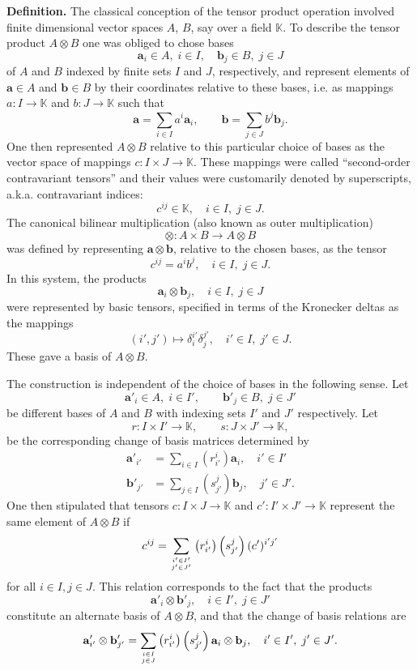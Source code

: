 \documentclass{article}
\newcommand{\lp}{\left(}
\newcommand{\rp}{\right)}
\newcommand{\va}{\mathbf{a}}
\newcommand{\vb}{\mathbf{b}}
\newcommand{\hva}{\mathbf{a}'}
\newcommand{\hvb}{\mathbf{b}'}
\newcommand{\kfield}{\mathbb{K}}
\newcommand{\hI}{I'}
\newcommand{\hJ}{J'}
\newcommand{\hi}{{i'}}
\newcommand{\hj}{{j'}}
\newcommand{\hc}{c'}
\begin{document}
{\bf Definition.} The classical conception of the tensor product
operation involved finite dimensional vector spaces $A$, $B$, say over
a field $\kfield$.  To describe the tensor product $A\otimes B$ one
was obliged to chose bases
$$\va_i\in A,\; i\in I,\quad \vb_j\in B,\; j\in J$$
of $A$ and $B$ indexed
by finite sets $I$ and $J$, respectively, and represent elements of
$\va\in A$ and $\vb\in B$ by their coordinates relative to these bases,
i.e. as mappings $a:I\rightarrow \kfield$ and $b:J\rightarrow \kfield$
such that
$$\va = \sum_{i\in I} a^i \va_i,\qquad \vb=\sum_{j\in J} b^j \vb_j.$$
One then represented $A\otimes B$ relative to this particular choice
of bases as the vector space of mappings $c:I\times J\rightarrow
\kfield$.  These mappings were called ``second-order contravariant
tensors'' and their values were customarily denoted by superscripts,
a.k.a. contravariant indices:
$$c^{ij}\in \kfield,\quad i\in I,\; j\in J.$$
The canonical bilinear
multiplication (also known as outer multiplication)
$$\otimes:A\times B\rightarrow A\otimes B$$
was defined by
representing $\va\otimes \vb$, relative to the chosen bases, as the
tensor
$$c^{ij} = a^ib^j,\quad i\in I,\;j\in J.$$
In this system, the
products
$$\va_i\otimes \vb_j,\quad i\in I,\; j\in J$$
were represented by basic
tensors, specified in terms of the Kronecker deltas as the mappings
$$(i',j')\mapsto \delta^{i'}_i \delta^{j'}_j,\quad i'\in I,\; j'\in J.$$
These gave a basis of $A\otimes B$.


The construction is independent of the choice of bases in the
following sense.  Let
$$\hva_i\in A,\; i\in \hI,\qquad \hvb_j\in B,\; j\in \hJ$$
be different bases of $A$ and $B$ with indexing sets $\hI$
and $\hJ$ respectively.  Let
$$
r:I\times \hI\rightarrow \kfield,\qquad
s:J\times \hJ\rightarrow \kfield,
$$
be the corresponding change of basis matrices determined by
\begin{align*}
\hva_{\hi} &= \sum_{i\in I} \lp r^i_{i'}\rp \va_i,\quad \hi\in I'\\
\hvb_{\hj} &= \sum_{j\in I} \lp s^j_{j'}\rp \vb_j,\quad \hj\in J'.
\end{align*}
One then stipulated that tensors $c:I\times J\rightarrow \kfield$ and 
$\hc:\hI\times \hJ\rightarrow \kfield$ represent the same element of
$A\otimes B$ if 
\begin{equation}
  \label{eq:eq1}
c^{ij} = \sum_{\genfrac{}{}{0pt}{}{i'\in I'}{j'\in J'}}
\lp r^i_{i'}\rp \lp s^j_{j'}\rp (c')^{i'j'}  
\end{equation}
for all $i\in I, j\in J$.  This relation corresponds to the fact that
the products
$$\hva_i\otimes \hvb_j,\quad i\in I',\; j\in J'$$
constitute an alternate basis of $A\otimes B$, and that the change of
basis relations are
\begin{equation}
  \label{eq:eq2}
  \hva_\hi \otimes \hvb_\hj = \sum_{\genfrac{}{}{0pt}{}{i\in I}{j\in J}}
  \lp r^i_{i'}\rp \lp s^j_{j'}\rp \va_i\otimes \vb_j,\quad
  \hi\in I',\; \hj\in J'.  
\end{equation}
\end{document}
